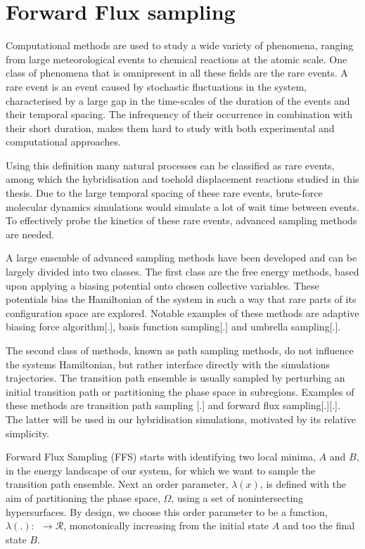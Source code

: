 \section{Forward Flux sampling}

Computational methods are used to study a wide variety of phenomena, ranging from
large meteorological events to chemical reactions at the atomic scale. One class of
phenomena that is omnipresent in all these fields are the rare events. A rare event is an
event caused by stochastic fluctuations in the system, characterised by a large
gap in the time-scales of the duration of the events and their temporal spacing.
The infrequency of their occurrence in combination with their short duration, makes them
hard to study with both experimental and computational approaches.

Using this definition many natural processes can be classified as rare events, among
which the hybridisation and toehold displacement reactions studied in this thesis. Due to
the large temporal spacing of these rare events, brute-force molecular dynamics
simulations would simulate a lot of wait time between events. To effectively probe the
kinetics of these rare events, advanced sampling methods are needed.

A large ensemble of advanced sampling methods have been developed and can be largely
divided into two classes. The first class are the free energy methods, based upon
applying a biasing potential onto chosen collective variables. These potentials bias the
Hamiltonian of the system in such a way that rare parts of its configuration space are
explored. Notable examples of these methods are adaptive biasing force algorithm[.],
basis function sampling[.] and umbrella sampling[.]. %

The second class of methods, known as path sampling methods, do not influence the
systems Hamiltonian, but rather interface directly with the simulations trajectories. The
transition path ensemble is usually sampled by perturbing an initial transition path or
partitioning the phase space in subregions. Examples of these methods are transition
path sampling [.] and forward flux sampling[.][.].  The latter will be used in our
hybridisation simulations, motivated by its relative simplicity.

Forward Flux Sampling (FFS) starts with identifying two local minima, $A$ and $B$, in the
energy landscape of our system, for which we want to sample the transition path ensemble.
Next an order parameter, $\lambda(x)$, is defined with the aim of partitioning the
phase space, $\Omega$, using a set of nonintersecting hypersurfaces. By design, we
choose this order parameter to be a function, $\lambda(.):\ $\Omega$\ \rightarrow
\mathcal{R}$, monotonically increasing from the initial state $A$ and too the final
state $B$.

